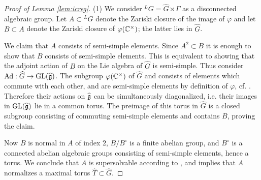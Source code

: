 \documentclass{article}
\theoremstyle{definition}
\numberwithin{equation}{section}
\renewcommand{\-}{\hyp{}}
\newcommand{\warn}[1]{{\leavevmode\color{red}[#1]}}
\newcommand{\Cent}{\mathrm{Cent}}
\begin{document}
\begin{proof}[Proof of Lemma \ref{lem:icreg}]
(1) We consider $^LG = \hat G \rtimes \Gamma$ as a disconnected algebraic group. Let $A \subset {^LG}$ denote the Zariski closure of the image of $\varphi$ and let $B \subset A$ denote the Zariski closure of $\varphi(\mathbb{C}^\times)$; the latter lies in $\hat G$. 

We claim that $A$ consists of semi-simple elements. Since $A^2 \subset B$ it is enough to show that $B$ consists of semi-simple elements. This is equivalent to showing that the adjoint action of $B$ on the Lie algebra of $\hat G$ is semi-simple. Thus consider $\textrm{Ad} : \widehat G \to \textrm{GL}(\mathfrak{\widehat g})$. The subgroup $\varphi(\mathbb{C}^\times)$ of $\hat G$ and consists of elements which commute with each other, and are semi-simple elements by definition of $\varphi$, cf. \cite[\S8]{BorCor}. Therefore their actions on $\mathfrak{\widehat g}$ can be simultaneously diagonalized, i.e. their images in $\textrm{GL}(\mathfrak{\widehat g})$ lie in a common torus. The preimage of this torus in $\hat G$ is a closed subgroup consisting of commuting semi-simple elements and contains $B$, proving the claim.

Now $B$ is normal in $A$ of index $2$, $B/B^\circ$ is a finite abelian group, and $B^\circ$ is a connected abelian algebraic groups consisting of semi-simple elements, hence a torus. We conclude that $A$ is supersolvable according to \cite[Definition 5.14]{SS70}, and \cite[Theorem 5.16]{SS70} implies that $A$ normalizes a maximal torus $\hat T \subset \hat G$.





\end{proof}
\end{document}

